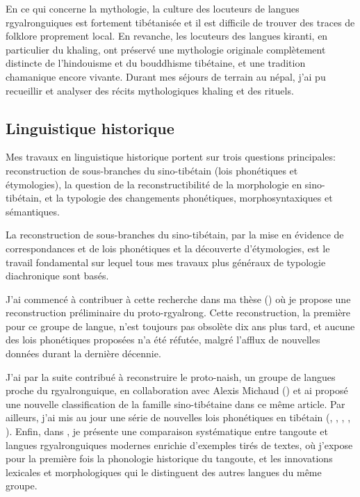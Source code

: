 \documentclass[oldfontcommands,oneside,a4paper,11pt]{article}
\begin{document}
En ce qui concerne la mythologie,    la culture des locuteurs de langues rgyalronguiques est fortement tibétanisée et il est difficile de trouver des traces de folklore proprement local. En revanche, les locuteurs des langues kiranti, en particulier du khaling, ont préservé une mythologie originale complètement distincte de l'hindouisme et du bouddhisme tibétaine, et une tradition chamanique encore vivante. Durant mes séjours de terrain au népal, j'ai pu recueillir et analyser des récits mythologiques khaling et des  rituels.

\subsection{Linguistique historique}  \label{sec:diachronie}
Mes travaux en linguistique historique portent sur trois questions principales: reconstruction de sous-branches du sino-tibétain (lois phonétiques et étymologies), la question de la reconstructibilité de la morphologie en sino-tibétain, et la typologie des changements phonétiques, morphosyntaxiques et sémantiques.
 
La reconstruction de sous-branches du sino-tibétain, par la mise en évidence de correspondances et de lois phonétiques et la découverte d'étymologies, est le travail fondamental sur lequel tous mes travaux plus généraux de typologie diachronique sont basés. 

J'ai commencé à contribuer à cette recherche dans ma thèse (\citealt{jacques04these}) où je propose une reconstruction préliminaire du proto-rgyalrong. Cette reconstruction, la première pour ce groupe de langue,   n'est toujours pas obsolète dix ans plus tard, et aucune des lois phonétiques proposées n'a été réfutée, malgré l'afflux de nouvelles données durant la dernière décennie. 

J'ai par la suite contribué à reconstruire le proto-naish, un groupe de langues proche du rgyalronguique, en collaboration avec Alexis Michaud (\citealt{jacques.michaud11naish}) et ai proposé une nouvelle classification de la famille sino-tibétaine dans ce même article. Par ailleurs, j'ai  mis au jour une série de nouvelles lois phonétiques en tibétain (\citealt{jacques09wazur},   \citealt{jacques09e},  \citealt{jacques12internal},   \citealt{jacques13yod}, \citealt{jacques14snom}). Enfin, dans  \citet{jacques14esquisse}, je présente une comparaison systématique entre tangoute et langues rgyalronguiques modernes enrichie d'exemples tirés de textes, où j'expose pour la première fois la phonologie historique du tangoute, et les innovations lexicales et morphologiques qui le distinguent des autres langues du même groupe.
\end{document}
